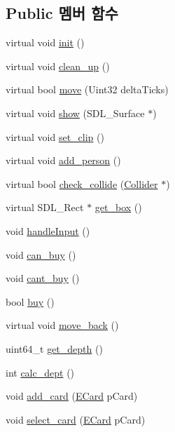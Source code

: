 \subsection*{\-Public 멤버 함수}
\begin{DoxyCompactItemize}
\item 
virtual void \hyperlink{class_hero_ae67cc4b7770083755895b78664d0ea34}{init} ()
\item 
virtual void \hyperlink{class_hero_a43836f7e926f00a4a27757a1ff7410a0}{clean\-\_\-up} ()
\item 
virtual bool \hyperlink{class_hero_a0961b6b66165095e3d764ccc60436846}{move} (\-Uint32 delta\-Ticks)
\item 
virtual void \hyperlink{class_hero_a9670c2232f5bf0f66bba60a7c747c53d}{show} (\-S\-D\-L\-\_\-\-Surface $\ast$)
\item 
virtual void \hyperlink{class_hero_aa5bde5d2f4a3d086b9e8ce2b969e2f3f}{set\-\_\-clip} ()
\item 
virtual void \hyperlink{class_hero_aa8934d60bc26f9eefdc15661d924e5e0}{add\-\_\-person} ()
\item 
virtual bool \hyperlink{class_hero_a51de873f46281790cc30814fffe0c62c}{check\-\_\-collide} (\hyperlink{class_collider}{\-Collider} $\ast$)
\item 
virtual \-S\-D\-L\-\_\-\-Rect $\ast$ \hyperlink{class_hero_abc32789cc9f1c1374a1d737da8f1a85c}{get\-\_\-box} ()
\item 
void \hyperlink{class_hero_a61e221d7b3ddfa81363ef1617d288b62}{handle\-Input} ()
\item 
void \hyperlink{class_hero_a9871bf08a8a2a4d739b59ccccf23a164}{can\-\_\-buy} ()
\item 
void \hyperlink{class_hero_a59e335e5c9169ea1055f49c89a2d965b}{cant\-\_\-buy} ()
\item 
bool \hyperlink{class_hero_af42a20265af06855ca1fdca1f82ed3c2}{buy} ()
\item 
virtual void \hyperlink{class_hero_a805934d28498398aecb10f8d2de6b63e}{move\-\_\-back} ()
\item 
uint64\-\_\-t \hyperlink{class_hero_ad12877233a3a18ae6db1ad758375bb2c}{get\-\_\-depth} ()
\item 
int \hyperlink{class_hero_a1c333d4e29923e655229eaf44178b3b9}{calc\-\_\-dept} ()
\item 
void \hyperlink{class_hero_a942b64ba1d1e3e5be2be79d0d737a83e}{add\-\_\-card} (\hyperlink{_constants_8h_a03f7ec9e12b891db1bbeda07eb4099d7}{\-E\-Card} p\-Card)
\item 
void \hyperlink{class_hero_a4b3ac843ddfeaed8d4138d4d6507b13a}{select\-\_\-card} (\hyperlink{_constants_8h_a03f7ec9e12b891db1bbeda07eb4099d7}{\-E\-Card} p\-Card)

\end{DoxyCompactItemize}
